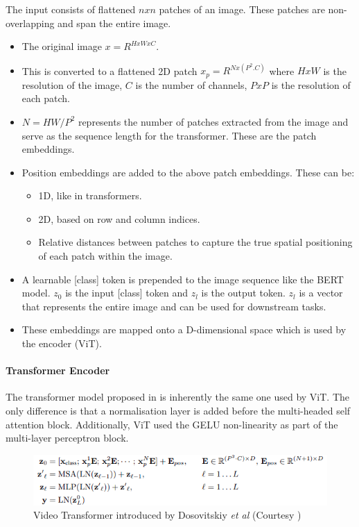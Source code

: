\par The input consists of flattened $nxn$ patches of an image. These patches are non-overlapping and span the entire image. 
\begin{itemize}
	\item The original image $x = R^{HxWxC}$.
	\item This is converted to a flattened 2D patch $x_p = R^{Nx(P^2.C)}$ where $HxW$ is the resolution of the image, $C$ is the number of channels, $PxP$ is the resolution of each patch.
	\item $N=HW / P^2$ represents the number of patches extracted from the image and serve as the sequence length for the transformer. These are the patch embeddings.
	\item Position embeddings are added to the above patch embeddings. These can be:
	\begin{itemize}
		\item 1D, like in transformers.
		\item 2D, based on row and column indices.
		\item Relative distances between patches to capture the true spatial positioning of each patch within the image.
	\end{itemize}
	\item A learnable [class] token is prepended to the image sequence like the BERT model. $z_0$ is the input [class] token and $z_l$ is the output token. $z_l$ is a vector that represents the entire image and can be used for downstream tasks.
	\item These embeddings are mapped onto a D-dimensional space which is used by the encoder (ViT).
\end{itemize}
\par

\paragraph{Transformer Encoder}

\par The transformer model proposed in \cite{tfm} is inherently the same one used by ViT. The only difference is that a normalisation layer is added before the multi-headed self attention block. Additionally, ViT used the GELU non-linearity as part of the multi-layer perceptron block. \par

\begin{figure}
	\centering
	\includegraphics[width=\linewidth]{assets/img/vit-eq.png}
	\caption{Video Transformer introduced by Dosovitskiy \textit{et al} (Courtesy \cite{vit})}
\end{figure}


